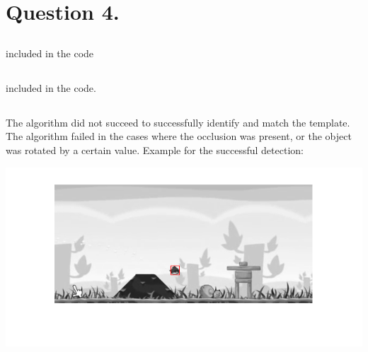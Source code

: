 \documentclass[a4paper]{iacas}
\begin{document}
%
%
%
%
%
\section{Question 4.}
\subsection{}
included in the code

\subsection{}
included in the code.


\subsection{}
The algorithm did not succeed to successfully identify and match the template. The algorithm failed in the cases where the occlusion was present, or the object was rotated by a certain value. 
\newline
Example for the successful detection:

\vskip 0.1in
\begin{minipage}{0.5\textwidth}
\centering
	\includegraphics[scale=0.8]{output/q4/algo_1/successful.png}
\end{minipage}
\vskip 0.1in
\end{document}
